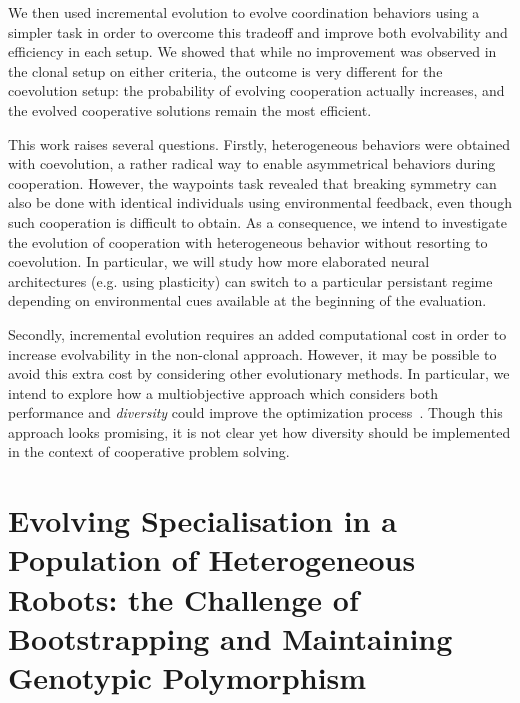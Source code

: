   We then used incremental evolution to evolve coordination behaviors using a simpler task in order to overcome this tradeoff and improve both evolvability and efficiency in each setup. We showed that while no improvement was observed in the clonal setup on either criteria, the outcome is very different for the coevolution setup: the probability of evolving cooperation actually increases, and the evolved cooperative solutions remain the most efficient.
 
  This work raises several questions. Firstly, heterogeneous behaviors were obtained with coevolution, a rather radical way to enable asymmetrical behaviors during cooperation. However, the waypoints task revealed that breaking symmetry can also be done with identical individuals using environmental feedback, even though such cooperation is difficult to obtain. As a consequence, we intend to investigate the evolution of cooperation with heterogeneous behavior without resorting to coevolution. In particular, we will study how more elaborated neural architectures (e.g. using plasticity) can switch to a particular persistant regime depending on environmental cues available at the beginning of the evaluation.

  Secondly, incremental evolution requires an added computational cost in order to increase evolvability in the non-clonal approach. However, it may be possible to avoid this extra cost by considering other evolutionary methods. In particular, we intend to explore how a multiobjective approach which considers both performance and \emph{diversity} could improve the optimization process~\cite{Lehman2008, Doncieux2014}. Though this approach looks promising, it is not clear yet how diversity should be implemented in the context of cooperative problem solving.


\section{Evolving Specialisation in a Population of Heterogeneous Robots: the Challenge of Bootstrapping and Maintaining Genotypic Polymorphism}
